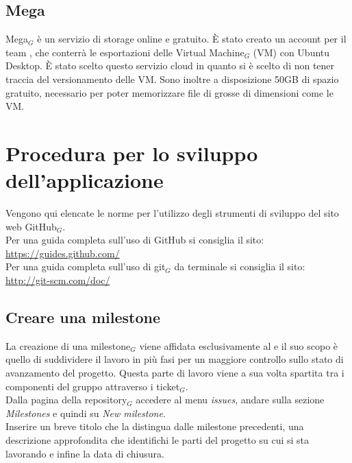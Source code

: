 \subsection{Mega}
Mega$_G$ è un servizio di storage online e gratuito. È stato creato un account per il team \gruppo, che conterrà le esportazioni delle Virtual Machine$_G$ (VM) con Ubuntu Desktop. È stato scelto questo servizio cloud in quanto si è scelto di non tener traccia del versionamento delle VM. Sono inoltre a disposizione 50GB di spazio gratuito, necessario per poter memorizzare file di grosse di dimensioni come le VM.

\newpage
\section{Procedura per lo sviluppo dell'applicazione}
Vengono qui elencate le norme per l'utilizzo degli strumenti di sviluppo del sito web GitHub$_G$. \\
Per una guida completa sull'uso di GitHub si consiglia il sito: \\
\url{https://guides.github.com/}\\
Per una guida completa sull'uso di git$_G$ da terminale si consiglia il sito: \\
\url{http://git-scm.com/doc/}

\subsection{Creare una milestone}
La creazione di una milestone$_G$ viene affidata esclusivamente al \ruoloResponsabile{} e il suo scopo è quello di suddividere il lavoro in più fasi per un maggiore controllo sullo stato di avanzamento del progetto. Questa parte di lavoro viene a sua volta spartita tra i componenti del gruppo attraverso i ticket$_G$. \\
    Dalla pagina della repository$_G$ accedere al menu \textit{issues}, andare sulla sezione \textit{Milestones} e quindi su \textit{New milestone}.\\
    Inserire un breve titolo che la distingua dalle milestone precedenti, una descrizione approfondita che identifichi le parti del progetto su cui si sta lavorando e infine la data di chiusura.

